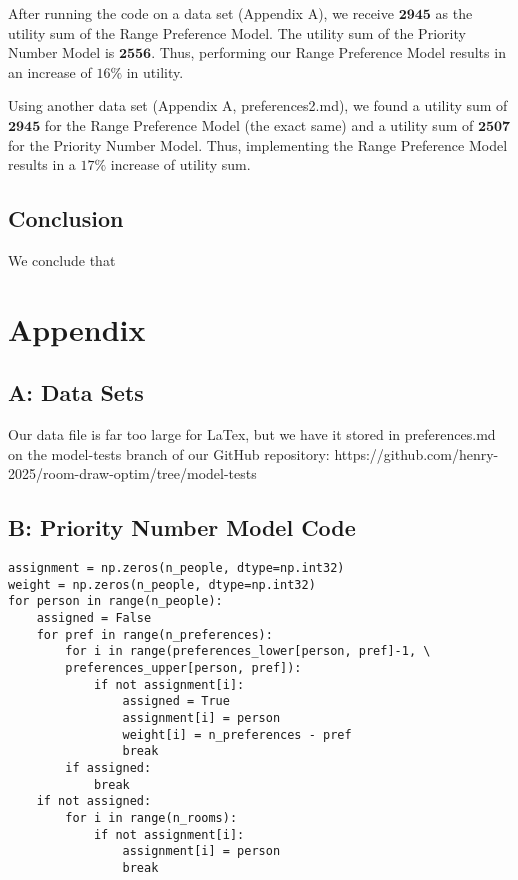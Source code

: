 \documentclass[12pt]{article}
\begin{document}
    After running the code on a data set (Appendix A), we receive $\textbf{2945}$ as the utility sum of the Range Preference Model. The utility sum of the Priority Number Model is $\textbf{2556}$. Thus, performing our Range Preference Model results in an increase of $16\%$ in utility.

    Using another data set (Appendix A, preferences2.md), we found a utility sum of $\textbf{2945}$ for the Range Preference Model (the exact same) and a utility sum of $\textbf{2507}$ for the Priority Number Model. Thus, implementing the Range Preference Model results in a $17\%$ increase of utility sum. 

    
    \subsection*{Conclusion}
    We conclude that 


    
    \section*{Appendix}
    \subsection*{A: Data Sets}
        Our data file is far too large for LaTex, but we have it stored in preferences.md on the model-tests branch of our GitHub repository:
        https://github.com/henry-2025/room-draw-optim/tree/model-tests


    
    \subsection*{B: Priority Number Model Code}
    \begin{verbatim}
assignment = np.zeros(n_people, dtype=np.int32)
weight = np.zeros(n_people, dtype=np.int32)
for person in range(n_people):
    assigned = False
    for pref in range(n_preferences):
        for i in range(preferences_lower[person, pref]-1, \
        preferences_upper[person, pref]):
            if not assignment[i]:
                assigned = True
                assignment[i] = person
                weight[i] = n_preferences - pref
                break
        if assigned:
            break
    if not assigned:
        for i in range(n_rooms):
            if not assignment[i]:
                assignment[i] = person
                break
    \end{verbatim}





    \nocite{*}
    \printbibliography[title = Bibliography]
    
\end{document}
